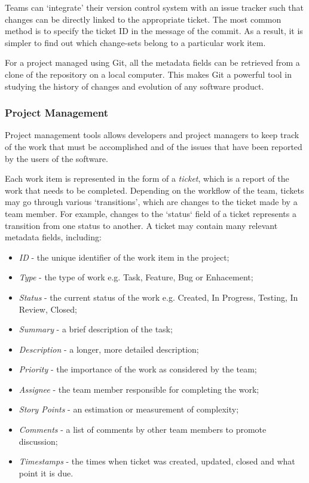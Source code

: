 \documentclass{mpaper}
\begin{document}
Teams can `integrate' their version control system with an issue tracker such
that changes can be directly linked to the appropriate ticket. The most common
method is to specify the ticket ID in the message of the commit. As a result, it
is simpler to find out which change-sets belong to a particular work item. 

For a project managed using Git, all the metadata fields can be retrieved from a
clone of the repository on a local computer. This makes Git a powerful tool in
studying the history of changes and evolution of any software product.

\subsubsection*{Project Management}
\label{project-management}

Project management tools allows developers and project managers to keep track of
the work that must be accomplished and of the issues that have been reported by
the users of the software. 

Each work item is represented in the form of a \emph{ticket}, which is a report
of the work that needs to be completed. Depending on the workflow of the team,
tickets may go through various `transitions', which are changes to the ticket
made by a team member. For example, changes to the `status` field of a ticket
represents a transition from one status to another. A ticket may contain many
relevant metadata fields, including:

\begin{itemize}
  \item \emph{ID} - the unique identifier of the work item in the project;
  \item \emph{Type} - the type of work e.g. Task, Feature, Bug or Enhacement;
  \item \emph{Status} - the current status of the work e.g. Created, In
  Progress, Testing, In Review, Closed;
  \item \emph{Summary} - a brief description of the task;
  \item \emph{Description} - a longer, more detailed description;
  \item \emph{Priority} - the importance of the work as considered by the team;
  \item \emph{Assignee} - the team member responsible for completing the work;
  \item \emph{Story Points} - an estimation or measurement of complexity;
  \item \emph{Comments} - a list of comments by other team members to promote
  discussion;
  \item \emph{Timestamps} - the times when ticket was created, updated, closed
  and what point it is due.
\end{itemize}
\end{document}
